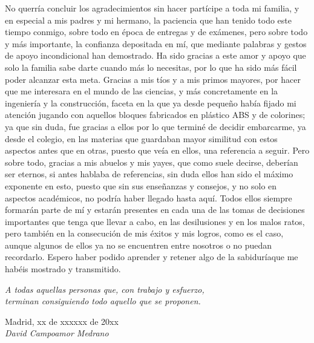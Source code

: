 No querría concluir los agradecimientos sin hacer partícipe a toda mi familia, y en especial a mis padres y mi hermano, la paciencia que han tenido todo este tiempo conmigo, sobre todo en época de entregas y de exámenes, pero sobre todo y más importante, la confianza depositada en mí, que mediante palabras y gestos de apoyo incondicional han demostrado. Ha sido gracias a este amor y apoyo que solo la familia sabe darte cuando más lo necesitas, por lo que ha sido más fácil poder alcanzar esta meta. Gracias a mis tíos y a mis primos mayores, por hacer que me interesara en el mundo de las ciencias, y más concretamente en la ingeniería y la construcción, faceta en la que ya desde pequeño había fijado mi atención jugando con aquellos bloques fabricados en plástico ABS y de colorines; ya que sin duda, fue gracias a ellos por lo que terminé de decidir embarcarme, ya desde el colegio, en las materias que guardaban mayor similitud con estos aspectos antes que en otras, puesto que veía en ellos, una referencia a seguir. Pero sobre todo, gracias a mis abuelos y mis yayes, que como suele decirse, deberían ser eternos, si antes hablaba de referencias, sin duda ellos han sido el máximo exponente en esto, puesto que sin sus enseñanzas y consejos, y no solo en aspectos académicos, no podría haber llegado hasta aquí. Todos ellos siempre formarán parte de mí y estarán presentes en cada una de las tomas de decisiones importantes que tenga que llevar a cabo, en las desilusiones y en los malos ratos, pero también en la consecución de mis éxitos y mis logros, como es el caso, aunque algunos de ellos ya no se encuentren entre nosotros o no puedan recordarlo. Espero haber podido aprender y retener algo de la sabiduríaque me habéis mostrado y transmitido.\\ 

\begin{flushright}
		\emph{A todas aquellas personas que, con trabajo y esfuerzo,\\
terminan consiguiendo todo aquello que se proponen.}\\
		\par
		\vspace{1.0 cm}
		Madrid, xx de xxxxxx de 20xx\\ %
		\emph{David Campoamor Medrano}
\end{flushright}

\thispagestyle{empty}

